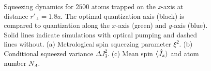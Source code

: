 \documentclass[preprint,aps,pra,onecolumn]{revtex4-1} %
\newcommand{\varz}{\Delta J_3^2}
\begin{document}
\begin{figure}
\begin{minipage}{.49\linewidth}
\centering
{}
\end{minipage}
\begin{minipage}{.49\linewidth}
\centering
{}
\end{minipage}
\caption{Squeezing dynamics for $2500$ atoms trapped on the \emph{x}-axis at distance $ r'\!_\perp=1.8a$. The optimal quantization axis (black) is compared to quantization along the $x$-axis (green) and \emph{y}-axis (blue). Solid lines indicate simulations with optical pumping and dashed lines without. (a) Metrological spin squeezing parameter $\xi^2$. (b) Conditional squeezed variance $\varz$. (c) Mean spin $\langle{\hat{J}_x}\rangle$ and atom number $N_A$.}\label{Fig::Squeezing_Dynamics}
\end{figure}
\end{document}
